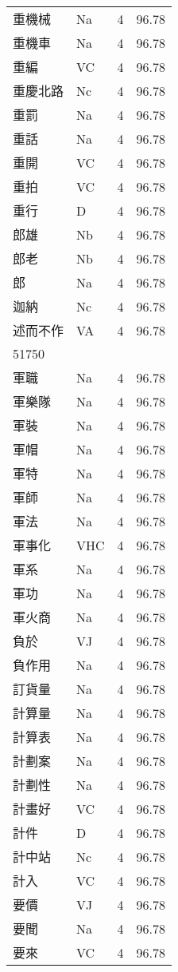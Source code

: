 \documentclass[twocolumn]{book}
\begin{document}
\begin{supertabular}{llrr}
重機械 & Na & 4 &  96.78\\
重機車 & Na & 4 &  96.78\\
重編 & VC & 4 &  96.78\\
重慶北路 & Nc & 4 &  96.78\\
重罰 & Na & 4 &  96.78\\
重話 & Na & 4 &  96.78\\
重開 & VC & 4 &  96.78\\
重拍 & VC & 4 &  96.78\\
重行 & D & 4 &  96.78\\
郎雄 & Nb & 4 &  96.78\\
郎老 & Nb & 4 &  96.78\\
郎 & Na & 4 &  96.78\\
迦納 & Nc & 4 &  96.78\\
述而不作 & VA & 4 &  96.78\\
51750\\
軍職 & Na & 4 &  96.78\\
軍樂隊 & Na & 4 &  96.78\\
軍裝 & Na & 4 &  96.78\\
軍帽 & Na & 4 &  96.78\\
軍特 & Na & 4 &  96.78\\
軍師 & Na & 4 &  96.78\\
軍法 & Na & 4 &  96.78\\
軍事化 & VHC & 4 &  96.78\\
軍系 & Na & 4 &  96.78\\
軍功 & Na & 4 &  96.78\\
軍火商 & Na & 4 &  96.78\\
負於 & VJ & 4 &  96.78\\
負作用 & Na & 4 &  96.78\\
訂貨量 & Na & 4 &  96.78\\
計算量 & Na & 4 &  96.78\\
計算表 & Na & 4 &  96.78\\
計劃案 & Na & 4 &  96.78\\
計劃性 & Na & 4 &  96.78\\
計畫好 & VC & 4 &  96.78\\
計件 & D & 4 &  96.78\\
計中站 & Nc & 4 &  96.78\\
計入 & VC & 4 &  96.78\\
要價 & VJ & 4 &  96.78\\
要聞 & Na & 4 &  96.78\\
要來 & VC & 4 &  96.78\\

\end{supertabular}
\end{document}
